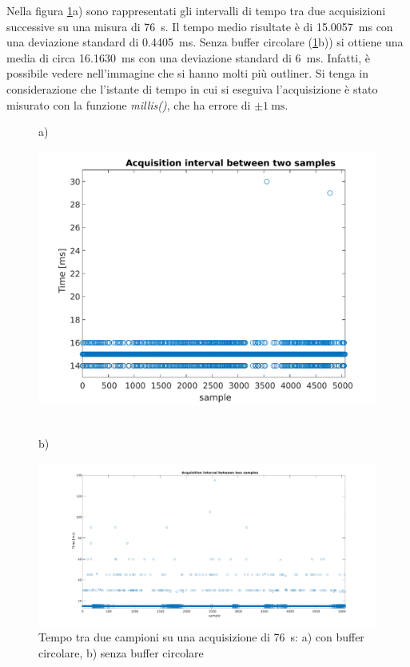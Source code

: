 Nella figura \ref{fig:time_interval}a) sono rappresentati gli intervalli di tempo tra due acquisizioni successive su una misura di \SI{76}{\second}. Il tempo medio risultate è di \SI{15.0057}{\milli\second} con una deviazione standard di \SI{0.4405}{\milli\second}. Senza buffer circolare (\Fig\ref{fig:time_interval}b)) si ottiene una media di circa \SI{16.1630}{\milli\second} con una deviazione standard di \SI{6}{\milli\second}. Infatti, è possibile vedere nell'immagine che si hanno molti più outliner.
Si tenga in considerazione che l'istante di tempo in cui si eseguiva l'acquisizione è stato misurato con la funzione \textit{millis()}, che ha errore di $\pm \SI{1}{\milli\second}$. 
\begin{figure}[tbh]
	\centering
	a)
	\begin{minipage}{.900\textwidth}
		\includegraphics[width=0.8\linewidth]{./ImageFiles/interval_time.pdf}
	\end{minipage}
	\\b)
	\begin{minipage}{.900\textwidth}
		\includegraphics[width=\linewidth]{./ImageFiles/interval_time_2}
	\end{minipage}
	\caption{Tempo tra due campioni su una acquisizione di \SI{76}{\second}: a) con buffer circolare, b) senza buffer circolare}
	\label{fig:time_interval}
\end{figure}

